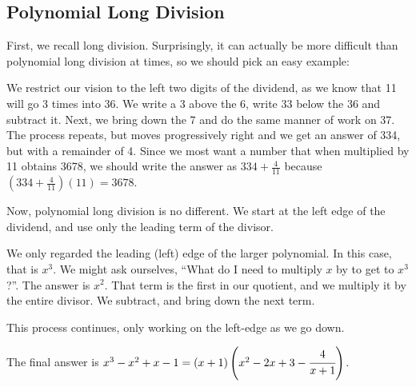 
\subsection{Polynomial Long Division}



First, we recall long division.  Surprisingly, it can actually be more difficult than polynomial long division at times, so we should pick an easy example:

\vspace{5mm}


We restrict our vision to the left two digits of the dividend, as we know that 11 will go 3 times into
36.  We write a 3 above the 6, write 33 below the 36 and subtract it.  Next, we bring down the 7
and do the same manner of work on 37.  The process repeats, but moves progressively right
and we get an answer of 334, but with a remainder of 4.  Since we most want a number that
when multiplied by 11 obtains 3678, we should write the answer as $334+\frac{4}{11}$ because
$\left(334+\frac{4}{11}\right)(11) = 3678$.


Now, polynomial long division is no different.  We start at the left edge of the dividend, and use 
only the leading term of the divisor.


We only regarded the leading (left) edge of the larger polynomial.  In this case, that is $x^3$.  
We might ask ourselves, ``What do I need to multiply $x$ by to get to $x^3$?''.  The answer is $x^2$.  
That term is the first in our quotient, and we multiply it by the entire divisor.  We subtract, 
and bring down the next term.


This process continues, only working on the left-edge as we go down.  


The final answer is $x^3-x^2+x-1 = (x+1)\left(x^2-2x+3-\cfrac{4}{x+1}\right)$.

